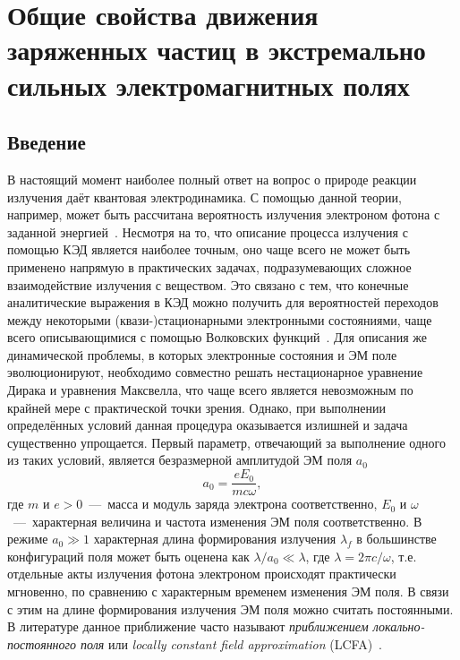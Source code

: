\chapter{Общие свойства движения заряженных частиц в экстремально сильных электромагнитных полях}\label{ch:ch1}

\section{Введение}
\label{sec:ch1/sec1}

В настоящий момент наиболее полный ответ на вопрос о природе реакции излучения даёт квантовая электродинамика.
С помощью данной теории, например, может быть рассчитана вероятность излучения электроном фотона с заданной энергией~\cite{berestetskii1982quantum, Baier98}.
Несмотря на то, что описание процесса излучения с помощью КЭД является наиболее точным, оно чаще всего не может быть применено напрямую в практических задачах, подразумевающих сложное взаимодействие излучения с веществом.
Это связано с тем, что конечные аналитические выражения в КЭД можно получить для вероятностей переходов между некоторыми (квази-)стационарными электронными состояниями, чаще всего описывающимися с помощью Волковских функций~\cite{wolkow1935klasse}.
Для описания же динамической проблемы, в которых электронные состояния и ЭМ поле эволюционируют, необходимо совместно решать нестационарное уравнение Дирака и уравнения Максвелла, что чаще всего является невозможным по крайней мере с практической точки зрения. 
Однако, при выполнении определённых условий данная процедура оказывается излишней и задача существенно упрощается.
Первый параметр, отвечающий за выполнение одного из таких условий, является безразмерной амплитудой ЭМ поля $a_0$
\begin{equation}
    a_0  = \frac{eE_0}{m c \omega},
\end{equation}
где $m$ и $e>0$~---~масса и модуль заряда электрона соответственно, $E_0$ и $\omega$~---~характерная величина и частота изменения ЭМ поля соответственно.
В режиме $a_0 \gg 1$ характерная длина формирования излучения $\lambda_f$ в большинстве конфигураций поля может быть оценена как $\lambda / a_0 \ll \lambda$, где $\lambda = 2\pi c/\omega$, т.е. отдельные акты излучения фотона электроном происходят практически мгновенно, по сравнению с характерным временем изменения ЭМ поля.
В связи с этим на длине формирования излучения ЭМ поля можно считать постоянными.
В литературе данное приближение часто называют \textit{приближением локально-постоянного поля} или \textit{locally constant field approximation} (LCFA)~\cite{nikishov1964quantum, berestetskii1982quantum, ritus1985quantum}.
